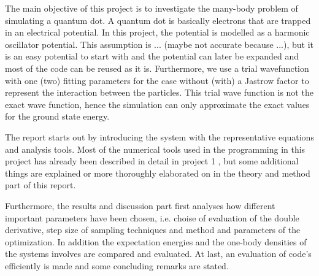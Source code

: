 The main objective of this project is to investigate the many-body problem of simulating a quantum dot. A quantum dot is basically electrons that are trapped in an electrical potential. In this project, the potential is modelled as a harmonic oscillator potential. This assumption is ... (maybe not accurate because ...), but it is an easy potential to start with and the potential can later be expanded and most of the code can be reused as it is. Furthermore, we use a trial wavefunction with one (two) fitting parameters for the case without (with) a Jastrow factor to represent the interaction between the particles. This trial wave function is not the exact wave function, hence the simulation can only approximate the exact values for the ground state energy.

The report starts out by introducing the system with the representative equations and analysis tools. Most of the numerical tools used in the programming in this project has already been described in detail in project 1 \cite{project1}, but some additional things are explained or more thoroughly elaborated on in the theory and method part of this report.

Furthermore, the results and discussion part first analyses how different important parameters have been chosen, i.e. choise of evaluation of the double derivative, step size of sampling techniques and method and parameters of the optimization. In addition the expectation energies and the one-body densities of the systems involves are compared and evaluated. At last, an evaluation of code's efficiently is made and some concluding remarks are stated.